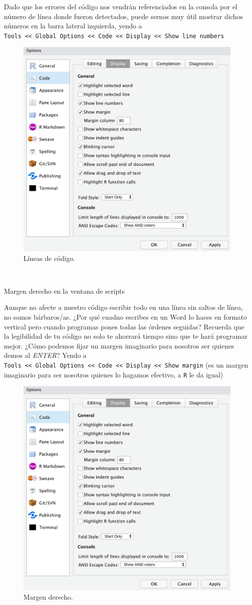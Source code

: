 \documentclass[11pt,]{book}
\begin{document}
Dado que los errores del código nos vendrán referenciados en la consola por el número de línea donde fueron detectados, puede sernos muy útil mostrar dichos números en la barra lateral izquierda, yendo a \texttt{Tools\ \textless{}\textless{}\ Global\ Options\ \textless{}\textless{}\ Code\ \textless{}\textless{}\ Display\ \textless{}\textless{}\ Show\ line\ numbers}

\begin{figure}

{\centering \includegraphics[width=0.5\linewidth]{./img/show_line_numbers} 

}

\caption{Líneas de código.}\label{fig:show-line-numbers}
\end{figure}

~

Margen derecho en la ventana de scripts

Aunque no afecte a nuestro código escribir todo en una línea sin saltos de línea, no somos bárbaros/as. ¿Por qué cuadno escribes en un Word lo haces en formato vertical pero cuando programas pones todas las órdenes seguidas? Recuerda que la legibilidad de tu código no solo te ahorrará tiempo sino que te hará programar mejor. ¿Cómo podemos fijar un margen imaginario para nosotros ser quienes demos al \emph{ENTER}? Yendo a \texttt{Tools\ \textless{}\textless{}\ Global\ Options\ \textless{}\textless{}\ Code\ \textless{}\textless{}\ Display\ \textless{}\textless{}\ Show\ margin} (es un margen imaginario para ser nosotros quienes lo hagamos efectivo, a \texttt{R} le da igual)

\begin{figure}

{\centering \includegraphics[width=0.5\linewidth]{./img/show_margin} 

}

\caption{Margen derecho.}\label{fig:show-margin}
\end{figure}
\end{document}
